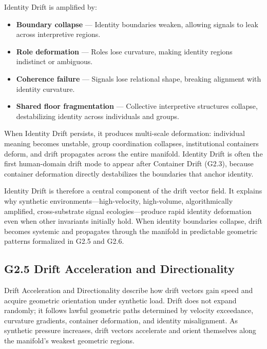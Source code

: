 \medskip

\noindent Identity Drift is amplified by:

\begin{itemize}[leftmargin=1.2cm]
    \item \textbf{Boundary collapse} — Identity boundaries weaken, allowing
    signals to leak across interpretive regions.

    \item \textbf{Role deformation} — Roles lose curvature, making identity
    regions indistinct or ambiguous.

    \item \textbf{Coherence failure} — Signals lose relational shape, breaking
    alignment with identity curvature.

    \item \textbf{Shared floor fragmentation} — Collective interpretive
    structures collapse, destabilizing identity across individuals and groups.
\end{itemize}

\medskip

\noindent When Identity Drift persists, it produces multi-scale deformation:
individual meaning becomes unstable, group coordination collapses, institutional
containers deform, and drift propagates across the entire manifold. Identity
Drift is often the first human-domain drift mode to appear after Container Drift
(G2.3), because container deformation directly destabilizes the boundaries that
anchor identity.

\medskip

\noindent Identity Drift is therefore a central component of the drift vector
field. It explains why synthetic environments—high-velocity, high-volume,
algorithmically amplified, cross-substrate signal ecologies—produce rapid
identity deformation even when other invariants initially hold. When identity
boundaries collapse, drift becomes systemic and propagates through the manifold
in predictable geometric patterns formalized in G2.5 and G2.6.

\subsection*{G2.5 Drift Acceleration and Directionality}

\noindent Drift Acceleration and Directionality describe how drift vectors gain
speed and acquire geometric orientation under synthetic load. Drift does not
expand randomly; it follows lawful geometric paths determined by velocity
exceedance, curvature gradients, container deformation, and identity
misalignment. As synthetic pressure increases, drift vectors accelerate and
orient themselves along the manifold’s weakest geometric regions.

